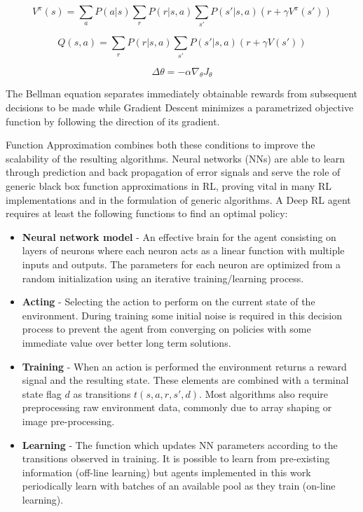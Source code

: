 \documentclass[journal]{IEEEtran}
\begin{document}
	\begin{equation} \label{eq:Bellman}
		V^\pi(s) = \sum_a P(a|s) \sum_r P(r|s,a) \sum_{s'} P(s'|s,a) (r + \gamma V^\pi(s'))
	\end{equation}
	
	\begin{equation} \label{eq:BellmanQ}
		Q(s,a) = \sum_r P(r|s,a) \sum_{s'} P(s'|s,a) (r + \gamma V(s'))
	\end{equation}
	
	\begin{equation} \label{eq:Gradient}
		\Delta \theta = - \alpha \nabla_\theta J_\theta
	\end{equation}
		
	The Bellman equation separates immediately obtainable rewards from subsequent decisions to be made while Gradient Descent minimizes a parametrized objective function by following the direction of its gradient. 
	
	Function Approximation \cite{xu2014reinforcement} combines both these conditions to improve the scalability of the resulting algorithms. Neural networks (NNs) are able to learn through prediction and back propagation of error signals and serve the role of generic black box function approximations in RL, proving vital in many RL implementations \cite{Tesauro1994TD} and in the formulation of generic algorithms. A Deep RL agent requires at least the following functions to find an optimal policy:

	\begin{itemize}
				
		\item \textbf{Neural network model} - An effective brain for the agent consisting on layers of neurons where each neuron acts as a linear function with multiple inputs and outputs. The parameters for each neuron are optimized from a random initialization using an iterative training/learning process.
				
		\item \textbf{Acting} - Selecting the action to perform on the current state of the environment. During training some initial noise is required in this decision process \cite{ten2003exploration} to prevent the agent from converging on policies with some immediate value over better long term solutions.
				
		\item \textbf{Training} - When an action is performed the environment returns a reward signal and the resulting state. These elements are combined with a terminal state flag $d$ as transitions $t(s,a,r,s',d)$. Most algorithms also require preprocessing raw environment data, commonly due to array shaping or image pre-processing.
				
		\item \textbf{Learning} - The function which updates NN parameters according to the transitions observed in training. It is possible to learn from pre-existing information (off-line learning) \cite{silver2014deterministic} but agents implemented in this work periodically learn with batches of an available pool as they train (on-line learning).
				
		\end{itemize}
	
\end{document}
